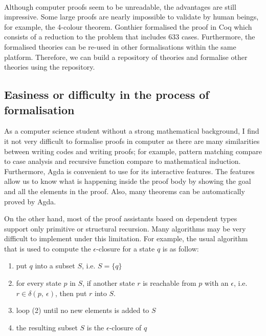 \paragraph{} Although computer proofs seem to be unreadable, the advantages
are still impressive. Some large proofs are nearly impossible
to validate by human beings, for example, the 4-colour
theorem. Gonthier \cite{gonthier2008} formalised the proof in Coq
which consists of a reduction to the problem that includes 633
cases. Furthermore, the formalised theories can be re-used in other
formalisations within the same platform. Therefore, we can build a
repository of theories and formalise other theories using the repository. 


\subsection{Easiness or difficulty in the process of formalisation}
\par As a computer science student without a strong mathematical
background, I find it not very difficult to formalise proofs in computer as there are many similarities between writing codes and writing
proofs; for example, pattern matching compare to case analysis and
recursive function compare to mathematical induction. Furthermore, Agda is convenient
to use for its interactive features. The features allow us to know
what is happening inside the proof body by showing the goal and all the
elements in the proof. Also, many theorems can be automatically proved
by Agda. 
\par On the other hand, most of the
proof assistants based on dependent types support only primitive or
structural recursion. Many algorithms may be very difficult to
implement under this limitation. For example, the usual algorithm that
is used to compute the \(\epsilon\)-closure for a state \(q\) is as follow:
\begin{enumerate}[nolistsep]
  \item put \(q\) into a subset \(S\), i.e. \(S = \{q\}\)
  \item for every state \(p\) in \(S\), if another state \(r\) is
    reachable from \(p\) with an \(\epsilon\), i.e. \(r \in
        \delta (p,\ \epsilon)\), then put \(r\) into \(S\). 
  \item loop (2) until no new elements is added to \(S\)
  \item the resulting subset \(S\) is the $\epsilon$-closure of \(q\)
\end{enumerate}

